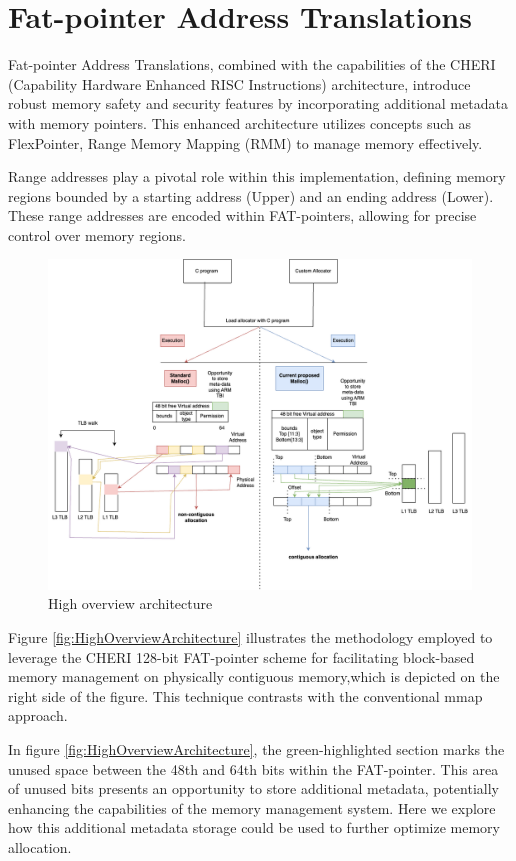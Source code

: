 \documentclass[11pt]{article}
\author{Akilan}
\date{\today}
\title{}
\begin{document}
\tableofcontents


\section{Fat-pointer Address Translations}
\label{sec:org98b9cf6}

Fat-pointer Address Translations, combined with the capabilities of the CHERI (Capability Hardware Enhanced RISC Instructions) 
architecture, introduce robust memory safety and security features by incorporating additional metadata 
with memory pointers. This enhanced architecture utilizes concepts such as FlexPointer, 
Range Memory Mapping (RMM) to manage memory effectively.

Range addresses play a pivotal role within this implementation, defining memory 
regions bounded by a starting address (Upper) and an ending address (Lower). 
These range addresses are encoded within FAT-pointers, allowing for precise 
control over memory regions.

\begin{figure}[htbp]
\centering
\includegraphics[width=.9\linewidth]{diagram/HighOverviewArchitecture.drawio.png}
\caption{\label{fig:orgf77b5d6}High overview architecture}
\end{figure}

Figure \ref{fig:HighOverviewArchitecture} illustrates
the methodology employed to leverage the CHERI 
128-bit FAT-pointer scheme for facilitating
block-based memory management on physically
contiguous memory,which is depicted on the
right side of the figure. 
This technique contrasts with the
conventional mmap approach.

In figure \ref{fig:HighOverviewArchitecture}, the green-highlighted
section marks the unused space between the 48th and 64th bits
within the FAT-pointer. This area of unused bits
presents an opportunity to store additional metadata,
potentially enhancing the capabilities of the
memory management system. 
Here we explore how this additional
metadata storage could be used to further
optimize memory allocation.
\end{document}
